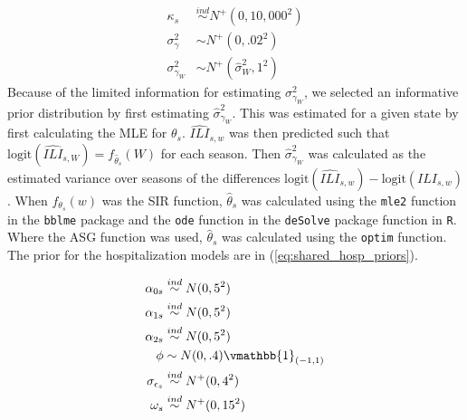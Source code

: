 \begin{equation}
\begin{aligned}
    \label{eq:shared_ili_priors}
        \kappa_s &\overset{ind}{\sim} N^+(0, 10,000^2) \\
        \sigma_{\gamma}^2 &\sim N^+(0, .02^2) \\
        \sigma_{\gamma_W}^2 &\sim N^+(\hat{\sigma}_W^2, 1^2)
\end{aligned}
\end{equation}
Because of the limited information for estimating $\sigma_{\gamma_W}^2$, 
we selected an informative prior distribution by first estimating  
$\hat{\sigma}_{\gamma_W}^2$. This was estimated for a given state by first 
calculating the MLE for $\theta_s$. 
$\widehat{ILI}_{s,w}$ was then predicted such that 
$\text{logit}(\widehat{ILI}_{s,W}) = f_{\hat{\theta}_s}(W)$ for each season. 
Then $\hat{\sigma}_{\gamma_W}^2$ was calculated as the estimated variance over 
seasons of the differences 
$\text{logit}(\widehat{ILI}_{s,w}) - \text{logit}(ILI_{s,w})$. 
When $f_{\theta_s}(w)$ was the SIR function, $\widehat{\theta}_s$ was 
calculated using the \texttt{mle2} function in the \texttt{bblme} package 
\cite[]{bolker2023bblme} and the \texttt{ode} function in the \texttt{deSolve} 
package \cite[]{soetaert2010desolve} function in \texttt{R}. Where the ASG 
function was used,  $\hat{\theta}_s$ was calculated using the \texttt{optim} 
function.
The prior for the hospitalization models are in (\ref{eq:shared_hosp_priors}).

\begin{equation}
\begin{aligned}
\label{eq:shared_hosp_priors}
        \alpha_{0s} &\overset{ind}{\sim} N(0, 5^2)\\
        \alpha_{1s} &\overset{ind}{\sim} N(0, 5^2)\\
        \alpha_{2s} &\overset{ind}{\sim} N(0, 5^2) \\
        \phi &\sim N(0, .4)\vmathbb{1}_{(-1,1)} \\
        \sigma_{\epsilon_s} &\overset{ind}{\sim} N^+(0, 4^2) \\
        \omega_s &\overset{ind}{\sim} N^+(0, 15^2)
\end{aligned}
\end{equation}





